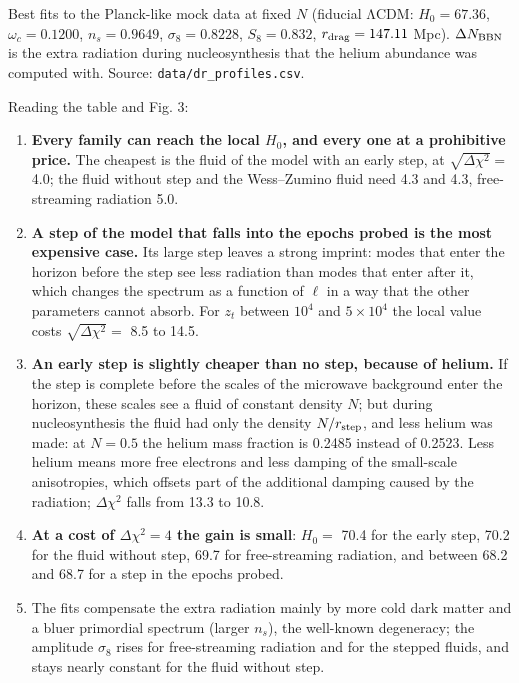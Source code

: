 \documentclass[
  10pt,
]{article}
\providecommand{\tightlist}{%
  \setlength{\itemsep}{0pt}\setlength{\parskip}{0pt}}
\begin{document}
Best fits to the Planck-like mock data at fixed \(N\) (fiducial ΛCDM:
\(H_0=67.36\), \(\omega_c=0.1200\), \(n_s=0.9649\), \(\sigma_8=0.8228\),
\(S_8=0.832\), \(r_{\rm drag}=147.11\) Mpc). \(\Delta N_{\rm BBN}\) is
the extra radiation during nucleosynthesis that the helium abundance was
computed with. Source: \texttt{data/dr\_profiles.csv}.

Reading the table and Fig. 3:

\begin{enumerate}
\def\labelenumi{\arabic{enumi}.}
\tightlist
\item
  \textbf{Every family can reach the local \(H_0\), and every one at a
  prohibitive price.} The cheapest is the fluid of the model with an
  early step, at \(\sqrt{\Delta\chi^2}=\) 4.0; the fluid without step
  and the Wess--Zumino fluid need 4.3 and 4.3, free-streaming radiation
  5.0.
\item
  \textbf{A step of the model that falls into the epochs probed is the
  most expensive case.} Its large step leaves a strong imprint: modes
  that enter the horizon before the step see less radiation than modes
  that enter after it, which changes the spectrum as a function of
  \(\ell\) in a way that the other parameters cannot absorb. For \(z_t\)
  between \(10^4\) and \(5\times10^4\) the local value costs
  \(\sqrt{\Delta\chi^2}=\) 8.5 to 14.5.
\item
  \textbf{An early step is slightly cheaper than no step, because of
  helium.} If the step is complete before the scales of the microwave
  background enter the horizon, these scales see a fluid of constant
  density \(N\); but during nucleosynthesis the fluid had only the
  density \(N/r_{\rm step}\), and less helium was made: at \(N=0.5\) the
  helium mass fraction is 0.2485 instead of 0.2523. Less helium means
  more free electrons and less damping of the small-scale anisotropies,
  which offsets part of the additional damping caused by the radiation;
  \(\Delta\chi^2\) falls from 13.3 to 10.8.
\item
  \textbf{At a cost of \(\Delta\chi^2=4\) the gain is small}: \(H_0=\)
  70.4 for the early step, 70.2 for the fluid without step, 69.7 for
  free-streaming radiation, and between 68.2 and 68.7 for a step in the
  epochs probed.
\item
  The fits compensate the extra radiation mainly by more cold dark
  matter and a bluer primordial spectrum (larger \(n_s\)), the
  well-known degeneracy; the amplitude \(\sigma_8\) rises for
  free-streaming radiation and for the stepped fluids, and stays nearly
  constant for the fluid without step.
\end{enumerate}
\end{document}
